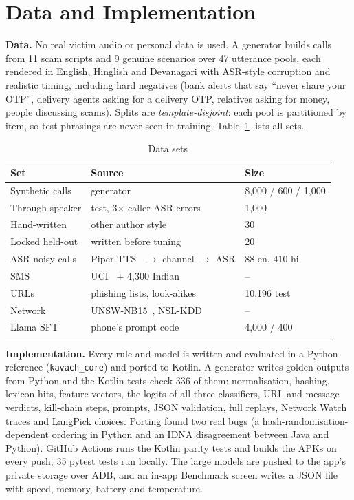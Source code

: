 \documentclass[conference]{IEEEtran}
\begin{document}
\section{Data and Implementation}\label{sec:impl}

\textbf{Data.} No real victim audio or personal data is used. A generator builds calls from 11 scam scripts and 9 genuine scenarios over 47 utterance pools, each rendered in English, Hinglish and Devanagari with ASR-style corruption and realistic timing, including hard negatives (bank alerts that say ``never share your OTP'', delivery agents asking for a delivery OTP, relatives asking for money, people discussing scams). Splits are \emph{template-disjoint}: each pool is partitioned by item, so test phrasings are never seen in training. Table~\ref{tab:data} lists all sets.

\begin{table}[t]
\caption{Data sets}
\label{tab:data}
\centering
\footnotesize
\setlength{\tabcolsep}{3pt}
\begin{tabular}{@{}lp{}l@{}}
\toprule
Set & Source & Size \\
\midrule
Synthetic calls & generator & 8,000 / 600 / 1,000 \\
Through speaker & test, 3$\times$ caller ASR errors & 1,000 \\
Hand-written & other author style & 30 \\
Locked held-out & written before tuning & 20 \\
ASR-noisy calls & Piper TTS~\cite{piper} $\to$ channel $\to$ ASR & 88 en, 410 hi \\
SMS & UCI~\cite{smsspam} + 4,300 Indian & -- \\
URLs & phishing lists, look-alikes & 10,196 test \\
Network & UNSW-NB15~\cite{unsw}, NSL-KDD~\cite{nslkdd} & -- \\
Llama SFT & phone's prompt code & 4,000 / 400 \\
\bottomrule
\end{tabular}
\end{table}

\textbf{Implementation.} Every rule and model is written and evaluated in a Python reference (\texttt{kavach\_core}) and ported to Kotlin. A generator writes golden outputs from Python and the Kotlin tests check 336 of them: normalisation, hashing, lexicon hits, feature vectors, the logits of all three classifiers, URL and message verdicts, kill-chain steps, prompts, JSON validation, full replays, Network Watch traces and LangPick choices. Porting found two real bugs (a hash-randomisation-dependent ordering in Python and an IDNA disagreement between Java and Python). GitHub Actions runs the Kotlin parity tests and builds the APKs on every push; 35 pytest tests run locally. The large models are pushed to the app's private storage over ADB, and an in-app Benchmark screen writes a JSON file with speed, memory, battery and temperature.
\end{document}
